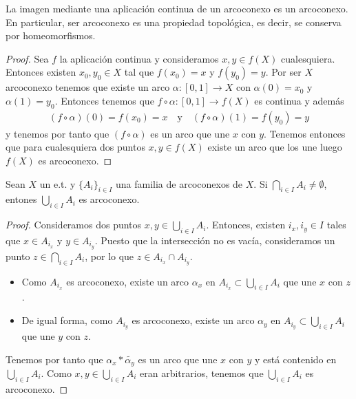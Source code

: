 \begin{teo}
    La imagen mediante una aplicación continua de un arcoconexo es un arcoconexo. En particular, ser arcoconexo es una propiedad topológica, es decir, se conserva por homeomorfismos.
    \begin{proof}
        Sea $f$ la aplicación continua y consideramos $x,y\in f(X)$ cualesquiera. Entonces existen $x_0,y_0\in X$ tal que $f(x_0)=x$ y $f(y_0) = y$. Por ser $X$ arcoconexo tenemos que existe un arco $\alpha:[0,1]\to X$ con $\alpha(0)=x_0$ y $\alpha(1)=y_0$. Entonces tenemos que $f\circ \alpha: [0,1]\to f(X)$ es continua y además
        \begin{gather*}
            (f\circ \alpha)(0) = f(x_0) = x \ \ \ \text{ y } \ \ \ (f\circ\alpha)(1) = f(y_0) = y
        \end{gather*}
        y tenemos por tanto que $(f\circ \alpha)$ es un arco que une $x$ con $y$. Tenemos entonces que para cualesquiera dos puntos $x,y\in f(X)$ existe un arco que los une luego $f(X)$ es arcoconexo.
    \end{proof}
\end{teo}

\begin{teo}
    Sean $X$ un e.t. y $\{A_i\}_{i\in I}$ una familia de arcoconexos de $X$. Si $\bigcap\limits_{i\in I}A_i \neq \emptyset$, entones $\bigcup\limits_{i\in I}A_i$ es arcoconexo.
\end{teo}
\begin{proof}
    Consideramos dos puntos $x,y\in \bigcup\limits_{i\in I}A_i$. Entonces, existen $i_x, i_y\in I$ tales que $x\in A_{i_x}$ y $y\in A_{i_y}$. Puesto que la intersección no es vacía, consideramos un punto $z\in \bigcap\limits_{i\in I}A_i$, por lo que $z\in A_{i_x}\cap A_{i_y}$. 
    \begin{itemize}
        \item Como $A_{i_x}$ es arcoconexo, existe un arco $\alpha_x$ en $A_{i_x}\subset \bigcup\limits_{i\in I}A_i$ que une $x$ con $z$.
        \item De igual forma, como $A_{i_y}$ es arcoconexo, existe un arco $\alpha_y$ en $A_{i_y}\subset \bigcup\limits_{i\in I}A_i$ que une $y$ con $z$.
    \end{itemize}
    Tenemos por tanto que $\alpha_x\ast \tilde{\alpha_y}$ es un arco que une $x$ con $y$ y está contenido en $\bigcup\limits_{i\in I}A_i$. Como $x,y\in \bigcup\limits_{i\in I}A_i$ eran arbitrarios, tenemos que $\bigcup\limits_{i\in I}A_i$ es arcoconexo.
\end{proof}

